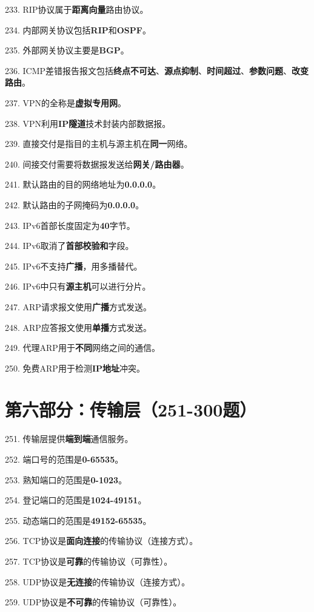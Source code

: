 \documentclass[12pt,a4paper,openany]{ctexbook}
\begin{document}
233. RIP协议属于\textbf{距离向量}路由协议。

234. 内部网关协议包括\textbf{RIP}和\textbf{OSPF}。

235. 外部网关协议主要是\textbf{BGP}。

236. ICMP差错报告报文包括\textbf{终点不可达}、\textbf{源点抑制}、\textbf{时间超过}、\textbf{参数问题}、\textbf{改变路由}。

237. VPN的全称是\textbf{虚拟专用网}。

238. VPN利用\textbf{IP隧道}技术封装内部数据报。

239. 直接交付是指目的主机与源主机在\textbf{同一}网络。

240. 间接交付需要将数据报发送给\textbf{网关/路由器}。

241. 默认路由的目的网络地址为\textbf{0.0.0.0}。

242. 默认路由的子网掩码为\textbf{0.0.0.0}。

243. IPv6首部长度固定为\textbf{40}字节。

244. IPv6取消了\textbf{首部校验和}字段。

245. IPv6不支持\textbf{广播}，用多播替代。

246. IPv6中只有\textbf{源主机}可以进行分片。

247. ARP请求报文使用\textbf{广播}方式发送。

248. ARP应答报文使用\textbf{单播}方式发送。

249. 代理ARP用于\textbf{不同}网络之间的通信。

250. 免费ARP用于检测\textbf{IP地址}冲突。

\section{第六部分：传输层（251-300题）}

251. 传输层提供\textbf{端到端}通信服务。

252. 端口号的范围是\textbf{0-65535}。

253. 熟知端口的范围是\textbf{0-1023}。

254. 登记端口的范围是\textbf{1024-49151}。

255. 动态端口的范围是\textbf{49152-65535}。

256. TCP协议是\textbf{面向连接}的传输协议（连接方式）。

257. TCP协议是\textbf{可靠}的传输协议（可靠性）。

258. UDP协议是\textbf{无连接}的传输协议（连接方式）。

259. UDP协议是\textbf{不可靠}的传输协议（可靠性）。
\end{document}
